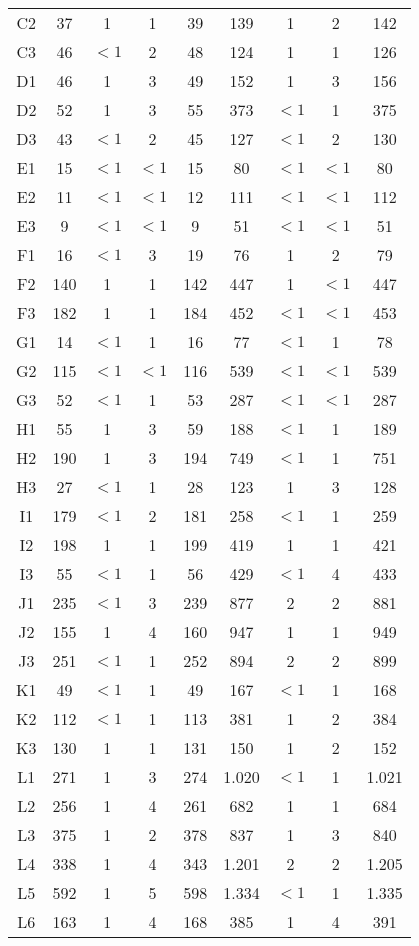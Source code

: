 \begin{center}
\begin{longtable}{ccccc|cccc}
C2&37&1&1&39&139&1&2&142\\
C3&46&$<1$&2&48&124&1&1&126\\
D1&46&1&3&49&152&1&3&156\\
D2&52&1&3&55&373&$<1$&1&375\\
D3&43&$<1$&2&45&127&$<1$&2&130\\
E1&15&$<1$&$<1$&15&80&$<1$&$<1$&80\\
E2&11&$<1$&$<1$&12&111&$<1$&$<1$&112\\
E3&9&$<1$&$<1$&9&51&$<1$&$<1$&51\\
F1&16&$<1$&3&19&76&1&2&79\\
F2&140&1&1&142&447&1&$<1$&447\\
F3&182&1&1&184&452&$<1$&$<1$&453\\
G1&14&$<1$&1&16&77&$<1$&1&78\\
G2&115&$<1$&$<1$&116&539&$<1$&$<1$&539\\
G3&52&$<1$&1&53&287&$<1$&$<1$&287\\
H1&55&1&3&59&188&$<1$&1&189\\
H2&190&1&3&194&749&$<1$&1&751\\
H3&27&$<1$&1&28&123&1&3&128\\
I1&179&$<1$&2&181&258&$<1$&1&259\\
I2&198&1&1&199&419&1&1&421\\
I3&55&$<1$&1&56&429&$<1$&4&433\\
J1&235&$<1$&3&239&877&2&2&881\\
J2&155&1&4&160&947&1&1&949\\
J3&251&$<1$&1&252&894&2&2&899\\
K1&49&$<1$&1&49&167&$<1$&1&168\\
K2&112&$<1$&1&113&381&1&2&384\\
K3&130&1&1&131&150&1&2&152\\
L1&271&1&3&274&1.020&$<1$&1&1.021\\
L2&256&1&4&261&682&1&1&684\\
L3&375&1&2&378&837&1&3&840\\
L4&338&1&4&343&1.201&2&2&1.205\\
L5&592&1&5&598&1.334&$<1$&1&1.335\\
L6&163&1&4&168&385&1&4&391\\
\end{longtable}
\end{center}

